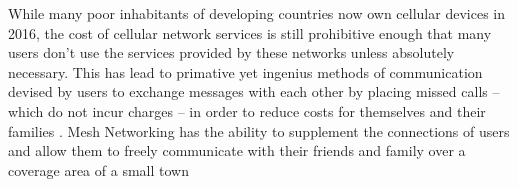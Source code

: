 While many poor inhabitants of developing countries now own cellular devices in 2016, the cost
of cellular network services is still prohibitive enough that many users don't use the services
provided by these networks unless absolutely necessary.
This has lead to primative yet ingenius methods of communication devised by users to exchange 
messages with each other by placing missed calls -- which do not incur charges -- in order to 
reduce costs for themselves and their families \cite{beeping}.
Mesh Networking has the ability to supplement the connections of users and allow them to freely 
communicate with their friends and family over a coverage area of a small town

